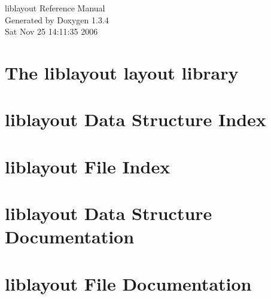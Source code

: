 \documentclass[a4paper]{book}
\begin{document}
\begin{titlepage}
\vspace*{7cm}
\begin{center}
{\Large liblayout Reference Manual}\\
\vspace*{1cm}
{\large Generated by Doxygen 1.3.4}\\
\vspace*{0.5cm}
{\small Sat Nov 25 14:11:35 2006}\\
\end{center}
\end{titlepage}
\clearemptydoublepage
{}
\tableofcontents
\clearemptydoublepage
{}
\chapter{The liblayout layout library }
\label{index}
\chapter{liblayout Data Structure Index}

\chapter{liblayout File Index}

\chapter{liblayout Data Structure Documentation}


\chapter{liblayout File Documentation}





\printindex
\end{document}
